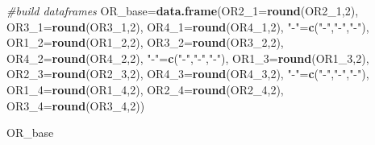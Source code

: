 \documentclass[11pt,]{article}
\newenvironment{Shaded}{\begin{snugshade}}{\end{snugshade}}
\newcommand{\KeywordTok}[1]{\textcolor[rgb]{0.13,0.29,0.53}{\textbf{#1}}}
\newcommand{\DataTypeTok}[1]{\textcolor[rgb]{0.13,0.29,0.53}{#1}}
\newcommand{\DecValTok}[1]{\textcolor[rgb]{0.00,0.00,0.81}{#1}}
\newcommand{\StringTok}[1]{\textcolor[rgb]{0.31,0.60,0.02}{#1}}
\newcommand{\CommentTok}[1]{\textcolor[rgb]{0.56,0.35,0.01}{\textit{#1}}}
\newcommand{\NormalTok}[1]{#1}
\begin{document}
\begin{Shaded}
\begin{Highlighting}[]
\CommentTok{#build dataframes}
\NormalTok{OR_base=}\KeywordTok{data.frame}\NormalTok{(}\DataTypeTok{OR2_1=}\KeywordTok{round}\NormalTok{(OR2_}\DecValTok{1}\NormalTok{,}\DecValTok{2}\NormalTok{),}
                    \DataTypeTok{OR3_1=}\KeywordTok{round}\NormalTok{(OR3_}\DecValTok{1}\NormalTok{,}\DecValTok{2}\NormalTok{),}
                    \DataTypeTok{OR4_1=}\KeywordTok{round}\NormalTok{(OR4_}\DecValTok{1}\NormalTok{,}\DecValTok{2}\NormalTok{),}
                    \StringTok{"-"}\NormalTok{=}\KeywordTok{c}\NormalTok{(}\StringTok{"-"}\NormalTok{,}\StringTok{"-"}\NormalTok{,}\StringTok{"-"}\NormalTok{),}
                    \DataTypeTok{OR1_2=}\KeywordTok{round}\NormalTok{(OR1_}\DecValTok{2}\NormalTok{,}\DecValTok{2}\NormalTok{),}
                    \DataTypeTok{OR3_2=}\KeywordTok{round}\NormalTok{(OR3_}\DecValTok{2}\NormalTok{,}\DecValTok{2}\NormalTok{),}
                    \DataTypeTok{OR4_2=}\KeywordTok{round}\NormalTok{(OR4_}\DecValTok{2}\NormalTok{,}\DecValTok{2}\NormalTok{),}
                    \StringTok{"-"}\NormalTok{=}\KeywordTok{c}\NormalTok{(}\StringTok{"-"}\NormalTok{,}\StringTok{"-"}\NormalTok{,}\StringTok{"-"}\NormalTok{),}
                    \DataTypeTok{OR1_3=}\KeywordTok{round}\NormalTok{(OR1_}\DecValTok{3}\NormalTok{,}\DecValTok{2}\NormalTok{),}
                    \DataTypeTok{OR2_3=}\KeywordTok{round}\NormalTok{(OR2_}\DecValTok{3}\NormalTok{,}\DecValTok{2}\NormalTok{),}
                    \DataTypeTok{OR4_3=}\KeywordTok{round}\NormalTok{(OR4_}\DecValTok{3}\NormalTok{,}\DecValTok{2}\NormalTok{),}
                    \StringTok{"-"}\NormalTok{=}\KeywordTok{c}\NormalTok{(}\StringTok{"-"}\NormalTok{,}\StringTok{"-"}\NormalTok{,}\StringTok{"-"}\NormalTok{),}
                    \DataTypeTok{OR1_4=}\KeywordTok{round}\NormalTok{(OR1_}\DecValTok{4}\NormalTok{,}\DecValTok{2}\NormalTok{),}
                    \DataTypeTok{OR2_4=}\KeywordTok{round}\NormalTok{(OR2_}\DecValTok{4}\NormalTok{,}\DecValTok{2}\NormalTok{),}
                    \DataTypeTok{OR3_4=}\KeywordTok{round}\NormalTok{(OR3_}\DecValTok{4}\NormalTok{,}\DecValTok{2}\NormalTok{))}
\end{Highlighting}
\end{Shaded}

\begin{Shaded}
\begin{Highlighting}[]
\NormalTok{OR_base}
\end{Highlighting}
\end{Shaded}
\end{document}
